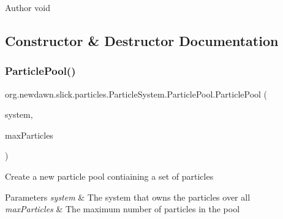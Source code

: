 \begin{DoxyAuthor}{Author}
void 
\end{DoxyAuthor}


\subsection{Constructor \& Destructor Documentation}
\mbox{\label{classorg_1_1newdawn_1_1slick_1_1particles_1_1_particle_system_1_1_particle_pool_a07642b4092c609693a51f6e6d7d728dc}} 
\subsubsection{\texorpdfstring{Particle\+Pool()}{ParticlePool()}}
{\footnotesize\ttfamily org.\+newdawn.\+slick.\+particles.\+Particle\+System.\+Particle\+Pool.\+Particle\+Pool (\begin{DoxyParamCaption}\item[{\mbox{\hyperlink{classorg_1_1newdawn_1_1slick_1_1particles_1_1_particle_system}{Particle\+System}}}]{system,  }\item[{int}]{max\+Particles }\end{DoxyParamCaption})\hspace{0.3cm}{\ttfamily [inline]}}

Create a new particle pool contiaining a set of particles


\begin{DoxyParams}{Parameters}
{\em system} & The system that owns the particles over all \\
\hline
{\em max\+Particles} & The maximum number of particles in the pool \\
\hline
\end{DoxyParams}

